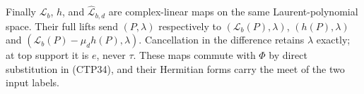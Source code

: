 Finally $\mathscr L_b$, $h$, and
$\widehat{\mathscr L}_{b,d}$ are complex-linear maps on the same
Laurent-polynomial space. Their full lifts send
$(P,\lambda)$ respectively to
$(\mathscr L_b(P),\lambda)$, $(h(P),\lambda)$ and
$(\mathscr L_b(P)-\mu_dh(P),\lambda)$.
Cancellation in the difference retains $\lambda$ exactly;
at top support it is $e$, never $\tau$. These maps commute
with $\Phi$ by direct substitution in (CTP34), and their
Hermitian forms carry the meet of the two input labels.
